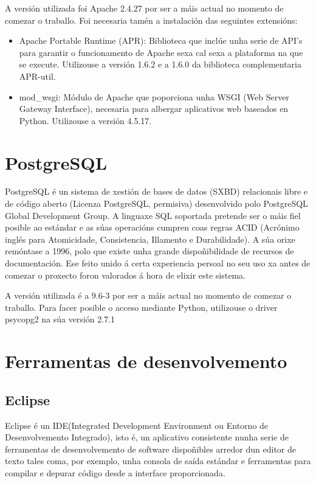 A versión utilizada foi Apache 2.4.27 por ser a máis actual no momento de comezar o traballo. Foi necesaria tamén a instalación das seguintes extensións:

\begin{itemize}
	\item Apache Portable Runtime (APR): Biblioteca que inclúe unha serie de API's para garantir o funcionamento de Apache sexa cal sexa a plataforma na que se execute. Utilizouse a versión 1.6.2 e a 1.6.0 da biblioteca complementaria APR-util. 
	
	\item mod\_wsgi: Módulo de Apache que poporciona unha WSGI (Web Server Gateway Interface), necesaria para albergar aplicativos web baseados en Python. Utilizouse a versión 4.5.17.
\end{itemize}


\section{PostgreSQL}

PostgreSQL é un sistema de xestión de bases de datos (SXBD) relacionais libre e de código aberto (Licenza PostgreSQL, permisiva) desenvolvido polo PostgreSQL Global Development Group. A linguaxe SQL soportada pretende ser o máis fiel posible ao estándar e as súas operacións cumpren coas regras ACID (Acrónimo inglés para Atomicidade, Consistencia, Illamento e Durabilidade)\cite{postgres1}. A súa orixe remóntase a 1996, polo que existe unha grande dispoñibilidade de recursos de documentación. Ese feito unido á certa experiencia persoal no seu uso xa antes de comezar o proxecto foron valorados á hora de elixir este sistema.

A versión utilizada é a 9.6-3 por ser a máis actual no momento de comezar o traballo. Para facer posible o acceso mediante Python, utilizouse o driver psycopg2 na súa versión 2.7.1


\section{Ferramentas de desenvolvemento}

\subsection{Eclipse}
\label{eclipse}

Eclipse é un IDE(Integrated Development Environment ou Entorno de Desenvolvemento Integrado), isto é, un aplicativo consistente nunha serie de ferramentas de desenvolvemento de software dispoñibles arredor dun editor de texto tales coma, por exemplo, unha consola de saída estándar e ferramentas para compilar e depurar código desde a interface proporcionada.

